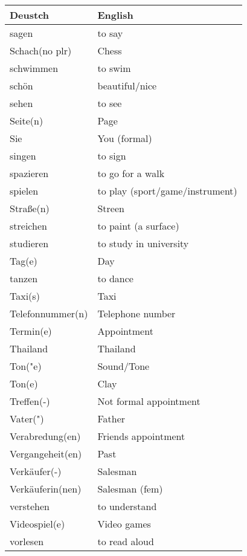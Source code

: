 \documentclass{article}
\renewcommand{\arraystretch}{1}
\begin{document}
\hfill
\begin{minipage}{0.48\textwidth}
    \centering
    \renewcommand{\arraystretch}{1.5}
    \begin{tabular}{|>{\raggedright\arraybackslash}p{3.5cm}|>{\raggedright\arraybackslash}p{3.5cm}|}
        \hline
        \rowcolor{gray!20} \textbf{Deustch} & \textbf{English} \\
        \hline
        sagen & to say \\\hline
        Schach(no plr) & Chess \\\hline
        schwimmen & to swim \\\hline
        schön & beautiful/nice \\\hline
        sehen & to see \\\hline
        Seite(n) & Page \\\hline
        Sie & You (formal) \\\hline
        singen & to sign \\\hline
        spazieren & to go for a walk \\\hline
        spielen & to play (sport/game/instrument) \\\hline
        Stra\ss{}e(n) & Streen \\\hline
        streichen & to paint (a surface) \\\hline
        studieren & to study in university \\\hline
        Tag(e) & Day \\\hline
        tanzen & to dance \\\hline
        Taxi(s) & Taxi \\\hline
        Telefonnummer(n) & Telephone number \\\hline
        Termin(e) & Appointment \\\hline
        Thailand & Thailand \\\hline
        Ton("e) & Sound/Tone \\\hline
        Ton(e) & Clay \\\hline
        Treffen(-) & Not formal appointment \\\hline
        Vater(") & Father \\\hline
        Verabredung(en) & Friends appointment \\\hline
        Vergangeheit(en) & Past \\\hline
        Verkäufer(-) & Salesman \\\hline
        Verkäuferin(nen) & Salesman (fem) \\\hline
        verstehen & to understand \\\hline
        Videospiel(e) & Video games \\\hline
        vorlesen & to read aloud \\\hline
    \end{tabular}
\end{minipage}
\end{document}
